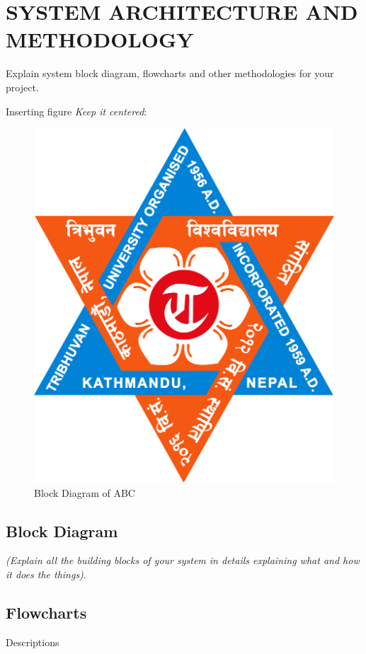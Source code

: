 \section{\MakeUppercase{System Architecture and Methodology}}
    Explain system block diagram, flowcharts and other methodologies for your project.
    
    Inserting figure \textit{Keep it centered}:
    \begin{figure}[H]
        \centering
        \includegraphics[scale=0.1]{TU_Logo.jpg}
        \caption{Block Diagram of ABC}
        \label{fig:logotu}
    \end{figure}

    \subsection{Block Diagram}
    \textit{(Explain all the building blocks of your system in details explaining what and how it does the things)}.

    \subsection{Flowcharts}
    Descriptions
